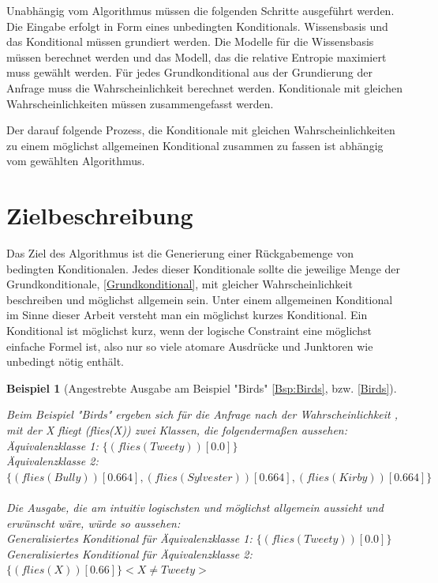 \documentclass[a4paper, 11pt]{book}
\newtheorem{Bsp}{Beispiel}[section]
\begin{document}
Unabhängig vom Algorithmus müssen die folgenden Schritte ausgeführt werden. Die Eingabe erfolgt in Form eines unbedingten Konditionals. Wissensbasis und das Konditional müssen grundiert werden. Die Modelle für die Wissensbasis müssen berechnet werden und das Modell, das die relative Entropie maximiert muss gewählt werden. Für jedes Grundkonditional aus der Grundierung der Anfrage muss die Wahrscheinlichkeit berechnet werden. Konditionale mit gleichen Wahrscheinlichkeiten müssen zusammengefasst werden. 

Der darauf folgende Prozess, die Konditionale mit gleichen Wahrscheinlichkeiten zu einem möglichst allgemeinen Konditional zusammen zu fassen ist abhängig vom gewählten Algorithmus.

\section{Zielbeschreibung} \label{Zielbeschreibung}                                                                                                                                                                   
Das Ziel des Algorithmus ist die Generierung einer Rückgabemenge von bedingten Konditionalen. Jedes dieser Konditionale sollte die jeweilige Menge der Grundkonditionale, \ref{Grundkonditional}, mit gleicher Wahrscheinlichkeit beschreiben und möglichst allgemein sein. Unter einem allgemeinen Konditional im Sinne dieser Arbeit versteht man ein möglichst kurzes Konditional. Ein Konditional ist möglichst kurz, wenn der logische Constraint eine möglichst einfache Formel ist, also nur so viele atomare Ausdrücke und Junktoren wie unbedingt nötig enthält.


\begin{Bsp}[Angestrebte Ausgabe am Beispiel "{}Birds"{} \ref{Bsp:Birds}, bzw.  \ref{Birds}]
	\label{Ausgabe_Birds}

	Beim Beispiel "{}Birds"{} ergeben sich für die Anfrage nach der Wahrscheinlichkeit , mit der X fliegt (flies(X)) zwei Klassen, die folgendermaßen aussehen:\\
	
	\noindent
			Äquivalenzklasse 1: $\{(flies(Tweety))[0.0]\}$\\
			Äquivalenzklasse 2: $\{(flies(Bully))[0.664], (flies(Sylvester))[0.664], (flies(Kirby))[0.664]\}$\\
			\\
			Die Ausgabe, die am intuitiv logischsten und möglichst allgemein aussieht und erwünscht wäre, würde so aussehen:\\
			   	Generalisiertes Konditional für Äquivalenzklasse 1: $\{(flies(Tweety))[0.0]\}$\\
				Generalisiertes Konditional für Äquivalenzklasse 2: $\{(flies(X))[0.66]\} <X \neq Tweety>$\\
\end{Bsp}
\end{document}
